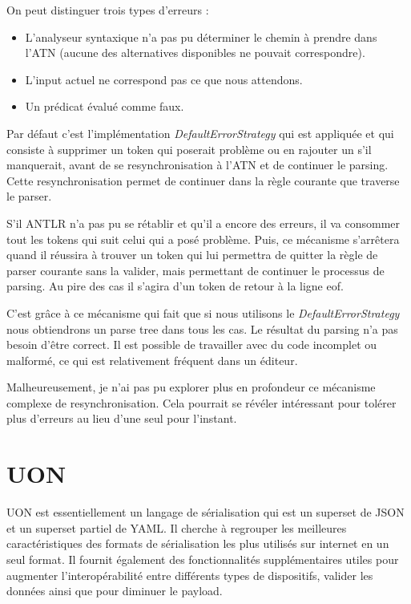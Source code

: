 \documentclass[
    iict, %
    il, %
]{heig-tb}
\begin{document}
On peut distinguer trois types d'erreurs \cite{ANTLRErrorStrategy} :
\begin{itemize}
    \item L'analyseur syntaxique n'a pas pu déterminer le chemin à prendre dans l'ATN (aucune des alternatives disponibles ne pouvait correspondre).
    \item L'input actuel ne correspond pas ce que nous attendons.
    \item Un prédicat évalué comme faux.
\end{itemize}

Par défaut c'est l'implémentation \emph{DefaultErrorStrategy} qui est appliquée et qui consiste à supprimer un token qui poserait problème ou en rajouter un s'il manquerait, avant de
se resynchronisation à l'ATN et de continuer le parsing. Cette resynchronisation permet de continuer dans la règle courante que traverse le parser. \cite{antlrs-error-handling-strategy}

S'il ANTLR n'a pas pu se rétablir et qu'il a encore des erreurs, il va consommer tout les tokens qui suit celui qui a posé problème.
Puis, ce mécanisme s'arrêtera quand il réussira à trouver un token qui lui permettra de quitter la règle de parser courante sans la valider, mais permettant de continuer le processus de parsing.
Au pire des cas il s'agira d'un token de retour à la ligne \Gls{eof}.

C'est grâce à ce mécanisme qui fait que si nous utilisons le \emph{DefaultErrorStrategy} nous obtiendrons un parse tree dans tous les cas.
Le résultat du parsing n'a pas besoin d'être correct. Il est possible de travailler avec du code incomplet ou malformé, ce qui est relativement fréquent dans un éditeur.

Malheureusement, je n'ai pas pu explorer plus en profondeur ce mécanisme complexe de resynchronisation.
Cela pourrait se révéler intéressant pour tolérer plus d'erreurs au lieu d'une seul pour l'instant.

\section{UON}\label{UON}
UON est essentiellement un langage de sérialisation qui est un superset de JSON et un superset partiel de YAML.
Il cherche à regrouper les meilleures caractéristiques des formats de sérialisation les plus utilisés sur internet en un seul format.
Il fournit également des fonctionnalités supplémentaires utiles pour augmenter l'interopérabilité entre différents types de dispositifs, valider les données ainsi que pour diminuer le payload.
\end{document}

